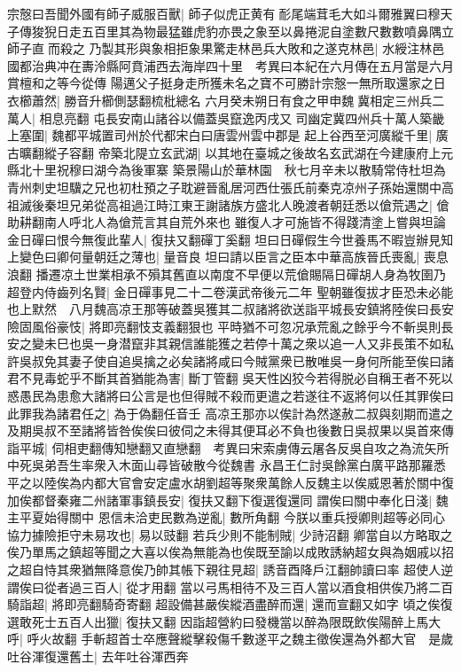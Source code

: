宗慤曰吾聞外國有師子威服百獸|{
	師子似虎正黄有耏尾端茸毛大如斗爾雅翼曰穆天子傳狻猊日走五百里其為物最猛雖虎豹亦畏之象至以鼻捲泥自塗數尺數數噴鼻隅立師子直而殺之}
乃製其形與象相拒象果驚走林邑兵大敗和之遂克林邑|{
	水綬注林邑國都治典冲在夀泠縣阿賁浦西去海岸四十里　考異曰本紀在六月傳在五月當是六月賞檀和之等今從傳}
陽邁父子挺身走所獲未名之寶不可勝計宗慤一無所取還家之日衣櫛蕭然|{
	勝音升櫛側瑟翻梳枇總名}
六月癸未朔日有食之甲申魏冀相定三州兵二萬人|{
	相息亮翻}
屯長安南山諸谷以備蓋吳竄逸丙戌又司幽定冀四州兵十萬人築畿上塞圍|{
	魏都平城置司州於代都宋白曰唐雲州雲中郡是}
起上谷西至河廣縱千里|{
	廣古曠翻縱子容翻}
帝築北隄立玄武湖|{
	以其地在臺城之後故名玄武湖在今建康府上元縣北十里祝穆曰湖今為後軍寨}
築景陽山於華林園　秋七月辛未以散騎常侍杜坦為青州刺史坦驥之兄也初杜預之子耽避晉亂居河西仕張氏前秦克凉州子孫始還關中高祖滅後秦坦兄弟從高祖過江時江東王謝諸族方盛北人晚渡者朝廷悉以傖荒遇之|{
	傖助耕翻南人呼北人為傖荒言其自荒外來也}
雖復人才可施皆不得踐清塗上嘗與坦論金日磾曰恨今無復此輩人|{
	復扶又翻磾丁奚翻}
坦曰日磾假生今世養馬不暇豈辦見知上變色曰卿何量朝廷之薄也|{
	量音良}
坦曰請以臣言之臣本中華高族晉氏喪亂|{
	喪息浪翻}
播遷凉土世業相承不殞其舊直以南度不早便以荒傖賜隔日磾胡人身為牧圉乃超登内侍齒列名賢|{
	金日磾事見二十二卷漢武帝後元二年}
聖朝雖復拔才臣恐未必能也上默然　八月魏高凉王那等破蓋吳獲其二叔諸將欲送詣平城長安鎮將陸俟曰長安險固風俗豪忮|{
	將即亮翻忮支義翻狠也}
平時猶不可忽况承荒亂之餘乎今不斬吳則長安之變未巳也吳一身潜竄非其親信誰能獲之若停十萬之衆以追一人又非長策不如私許吳叔免其妻子使自追吳擒之必矣諸將咸曰今賊黨衆已散唯吳一身何所能至俟曰諸君不見毒蛇乎不斷其首猶能為害|{
	斷丁管翻}
吳天性凶狡今若得脱必自稱王者不死以惑愚民為患愈大諸將曰公言是也但得賊不殺而更遣之若遂往不返將何以任其罪俟曰此罪我為諸君任之|{
	為于偽翻任音壬}
高凉王那亦以俟計為然遂赦二叔與刻期而遣之及期吳叔不至諸將皆咎俟俟曰彼伺之未得其便耳必不負也後數日吳叔果以吳首來傳詣平城|{
	伺相吏翻傳知戀翻又直戀翻　考異曰宋索虜傳云屠各反吳自攻之為流矢所中死吳弟吾生率衆入木面山尋皆破散今從魏書}
永昌王仁討吳餘黨白廣平路那羅悉平之以陸俟為内都大官會安定盧水胡劉超等聚衆萬餘人反魏主以俟威恩著於關中復加俟都督秦雍二州諸軍事鎮長安|{
	復扶又翻下復選復還同}
謂俟曰關中奉化日淺|{
	魏主平夏始得關中}
恩信未洽吏民數為逆亂|{
	數所角翻}
今朕以重兵授卿則超等必同心協力據險拒守未易攻也|{
	易以豉翻}
若兵少則不能制賊|{
	少詩沼翻}
卿當自以方略取之俟乃單馬之鎮超等聞之大喜以俟為無能為也俟既至諭以成敗誘納超女與為姻戚以招之超自恃其衆猶無降意俟乃帥其帳下親往見超|{
	誘音酉降戶江翻帥讀曰率}
超使人逆謂俟曰從者過三百人|{
	從才用翻}
當以弓馬相待不及三百人當以酒食相供俟乃將二百騎詣超|{
	將即亮翻騎奇寄翻}
超設備甚嚴俟縱酒盡醉而還|{
	還而宣翻又如字}
頃之俟復選敢死士五百人出獵|{
	復扶又翻}
因詣超營約曰發機當以醉為限既飲俟陽醉上馬大呼|{
	呼火故翻}
手斬超首士卒應聲縱擊殺傷千數遂平之魏主徵俟還為外都大官　是歲吐谷渾復還舊土|{
	去年吐谷渾西奔}


